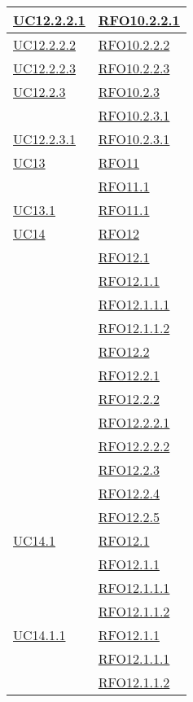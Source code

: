 \begin{longtable}{|>{\centering}m{5cm}|m{5cm}<{\centering}|}
\hyperlink{UC12.2.2.1}{UC12.2.2.1} & \hyperlink{RFO10.2.2.1}{RFO10.2.2.1}\\\hline
\hyperlink{UC12.2.2.2}{UC12.2.2.2} & \hyperlink{RFO10.2.2.2}{RFO10.2.2.2}\\\hline
\hyperlink{UC12.2.2.3}{UC12.2.2.3} & \hyperlink{RFO10.2.2.3}{RFO10.2.2.3}\\\hline
\hyperlink{UC12.2.3}{UC12.2.3} & \hyperlink{RFO10.2.3}{RFO10.2.3}\\
& \hyperlink{RFO10.2.3.1}{RFO10.2.3.1}\\\hline
\hyperlink{UC12.2.3.1}{UC12.2.3.1} & \hyperlink{RFO10.2.3.1}{RFO10.2.3.1}\\\hline
\hyperlink{UC13}{UC13} & \hyperlink{RFO11}{RFO11}\\
& \hyperlink{RFO11.1}{RFO11.1}\\\hline
\hyperlink{UC13.1}{UC13.1} & \hyperlink{RFO11.1}{RFO11.1}\\\hline
\hyperlink{UC14}{UC14} & \hyperlink{RFO12}{RFO12}\\
& \hyperlink{RFO12.1}{RFO12.1}\\
& \hyperlink{RFO12.1.1}{RFO12.1.1}\\
& \hyperlink{RFO12.1.1.1}{RFO12.1.1.1}\\
& \hyperlink{RFO12.1.1.2}{RFO12.1.1.2}\\
& \hyperlink{RFO12.2}{RFO12.2}\\
& \hyperlink{RFO12.2.1}{RFO12.2.1}\\
& \hyperlink{RFO12.2.2}{RFO12.2.2}\\
& \hyperlink{RFO12.2.2.1}{RFO12.2.2.1}\\
& \hyperlink{RFO12.2.2.2}{RFO12.2.2.2}\\
& \hyperlink{RFO12.2.3}{RFO12.2.3}\\
& \hyperlink{RFO12.2.4}{RFO12.2.4}\\
& \hyperlink{RFO12.2.5}{RFO12.2.5}\\\hline
\hyperlink{UC14.1}{UC14.1} & \hyperlink{RFO12.1}{RFO12.1}\\
& \hyperlink{RFO12.1.1}{RFO12.1.1}\\
& \hyperlink{RFO12.1.1.1}{RFO12.1.1.1}\\
& \hyperlink{RFO12.1.1.2}{RFO12.1.1.2}\\\hline
\hyperlink{UC14.1.1}{UC14.1.1} & \hyperlink{RFO12.1.1}{RFO12.1.1}\\
& \hyperlink{RFO12.1.1.1}{RFO12.1.1.1}\\
& \hyperlink{RFO12.1.1.2}{RFO12.1.1.2}\\\hline

\end{longtable}
